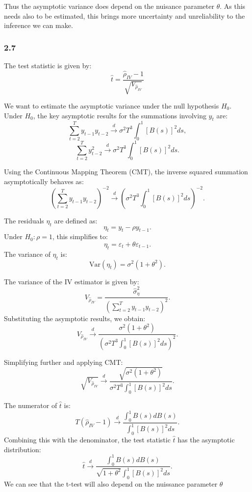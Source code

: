 \documentclass{article}
\begin{document}
Thus the asymptotic variance does depend on the nuisance parameter $\theta$. As this needs also to be estimated, 
this brings more uncertainty and unreliability to the inference we can make. 



\subsubsection*{2.7}

The test statistic is given by:
\[
\hat{t} = \frac{\hat{\rho}_{IV} - 1}{\sqrt{V_{\hat{\rho}_{IV}}}}
\]

We want to estimate the asymptotic variance under the null hypothesis \( H_0 \). Under \( H_0 \), the key asymptotic results for the summations involving \( y_t \) are:
\[
\sum_{t=2}^{T} y_{t-1}y_{t-2} \xrightarrow{d} \sigma^2 T^3 \int_0^1 [B(s)]^2 ds,
\]
\[
\sum_{t=2}^{T} y_{t-2}^2 \xrightarrow{d} \sigma^2 T^3 \int_0^1 [B(s)]^2 ds.
\]

Using the Continuous Mapping Theorem (CMT), the inverse squared summation asymptotically behaves as:
\[
\left(\sum_{t=2}^{T} y_{t-1}y_{t-2}\right)^{-2} \xrightarrow{d} \left(\sigma^2 T^3 \int_0^1 [B(s)]^2 ds\right)^{-2}.
\]

The residuals \( \eta_t \) are defined as:
\[
\eta_t = y_t - \rho y_{t-1}.
\]
Under \( H_0: \rho = 1 \), this simplifies to:
\[
\eta_t = \varepsilon_t + \theta \varepsilon_{t-1}.
\]
The variance of \( \eta_t \) is:
\[
\text{Var}(\eta_t) = \sigma^2 (1 + \theta^2).
\]

The variance of the IV estimator is given by:
\[
V_{\hat{\rho}_{IV}} = \frac{\hat{\sigma}_\eta^2}{\left(\sum_{t=2}^{T} y_{t-1}y_{t-2}\right)^2}.
\]
Substituting the asymptotic results, we obtain:
\[
V_{\hat{\rho}_{IV}} \xrightarrow{d} \frac{\sigma^2 (1 + \theta^2)}{\left(\sigma^2 T^3 \int_0^1 [B(s)]^2 ds\right)^2}.
\]

Simplifying further and applying CMT:
\[
\sqrt{V_{\hat{\rho}_{IV}}} \xrightarrow{d} \frac{\sqrt{\sigma^2 (1 + \theta^2)}}{\sigma^2 T^3 \int_0^1 [B(s)]^2 ds}.
\]

The numerator of \( \hat{t} \) is:
\[
T (\hat{\rho}_{IV} - 1) \xrightarrow{d} \frac{\int_0^1 B(s) dB(s)}{\int_0^1 [B(s)]^2 ds}.
\]
Combining this with the denominator, the test statistic \( \hat{t} \) has the asymptotic distribution:
\[
\hat{t} \xrightarrow{d} \frac{\int_0^1 B(s) dB(s)}{\sqrt{1 + \theta^2} \int_0^1 [B(s)]^2 ds}.
\]
We can see that the t-test will also depend on the nuissance parameter $\theta$
\end{document}
